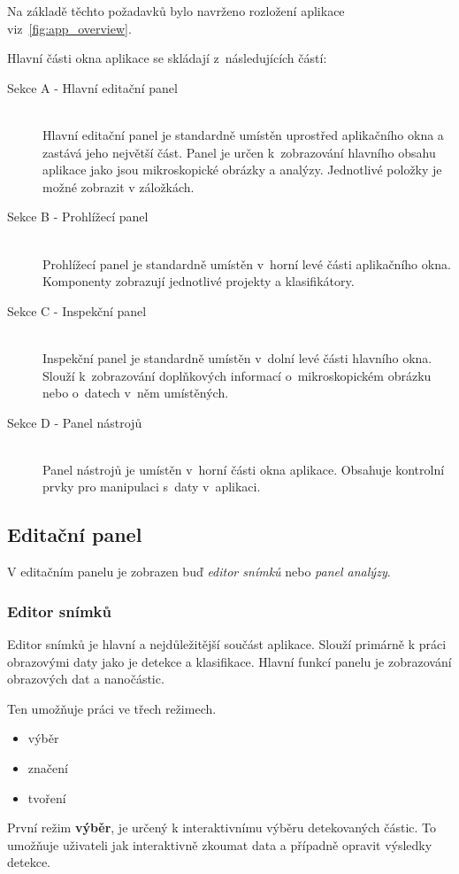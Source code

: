 \documentclass[11pt,twoside,a4paper,table]{book}
\begin{document}
Na základě těchto požadavků bylo navrženo rozložení aplikace viz~\ref{fig:app_overview}. 

Hlavní části okna aplikace se skládají z~následujících částí:
\begin{description}
	\item[Sekce A - Hlavní editační panel] \hfill \\
	Hlavní editační panel je standardně umístěn uprostřed aplikačního okna a zastává jeho největší část. Panel je určen k~zobrazování hlavního obsahu aplikace jako jsou mikroskopické obrázky a analýzy. Jednotlivé položky je možné zobrazit v záložkách. 
	\item[Sekce B - Prohlížecí panel] \hfill \\
	Prohlížecí panel je standardně umístěn v~horní levé části aplikačního okna. Komponenty zobrazují jednotlivé projekty a klasifikátory.
	\item[Sekce C - Inspekční panel] \hfill \\
	Inspekční panel je standardně umístěn v~dolní levé části hlavního okna. Slouží k~zobrazování doplňkových informací o~mikroskopickém obrázku nebo o~datech v~něm umístěných.
	\item[Sekce D - Panel nástrojů] \hfill \\
	Panel nástrojů je umístěn v~horní části okna aplikace. Obsahuje kontrolní prvky pro manipulaci s~daty v~aplikaci.
\end{description}
\subsection{Editační panel}
V editačním panelu je zobrazen buď \textit{editor snímků} nebo \textit{panel analýzy}. 

\subsubsection{Editor snímků}
Editor snímků je hlavní a nejdůležitější součást aplikace. Slouží primárně k práci obrazovými daty jako je detekce a klasifikace. Hlavní funkcí panelu je zobrazování obrazových dat a nanočástic.

Ten umožňuje práci ve třech režimech.
\begin{itemize}
\item výběr
\item značení
\item tvoření
\end{itemize}

První režim \textbf{výběr}, je určený k interaktivnímu výběru detekovaných částic. To umožňuje uživateli jak interaktivně zkoumat data a případně opravit výsledky detekce.
\end{document}

